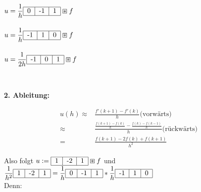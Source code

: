 \documentclass{article}
\theoremstyle{plain}
\theoremstyle{definition}
\numberwithin{equation}{section}
\newcommand{\mtitle}[1] {
    \begin{center}
        \large{\textbf{#1}}
    \end{center}
}
\begin{document}
    \begin{minipage}[c]{0.3\linewidth}
        \ \\
        $u=\displaystyle \frac{1}{h}\begin{tabular}{|c|c|c|}
            \hline
            0 & -1 & 1\\
            \hline
        \end{tabular} \boxast f$\\
        \ \\
        $u=\displaystyle \frac{1}{h}\begin{tabular}{|c|c|c|}
            \hline
            -1 & 1 & 0\\
            \hline
        \end{tabular} \boxast f$\\
        \ \\
        $u=\displaystyle \frac{1}{2h}\begin{tabular}{|c|c|c|}
            \hline
            -1 & 0 & 1\\
            \hline
            \end{tabular} \boxast f$\\
    \end{minipage}
    \ \\

    \mtitle{2. Ableitung:}

    \begin{align*}
        u(h) \approx & \frac{f'(k+1) - f'(k)}{h} \text{(vorwärts)}\\
        \approx & \frac{\frac{f(k+1) - f(k)}{h} - \frac{f(k) - f(k-1)}{h}}{h} \text{(rückwärts)} \\
        = & \frac{f(k+1) -2 f(k) + f(k+1)}{h^2}
    \end{align*}

    Also folgt $\displaystyle u:=\begin{tabular}{|c|c|c|}
        \hline
        1 & -2 & 1\\
        \hline
        \end{tabular} \boxast f$ und $\displaystyle \frac{1}{h^2}\begin{tabular}{|c|c|c|}
            \hline
            1 & -2 & 1\\
            \hline
            \end{tabular} = \frac{1}{h}\begin{tabular}{|c|c|c|}
                \hline
                0 & -1 & 1\\
                \hline
                \end{tabular} * \frac{1}{h}\begin{tabular}{|c|c|c|}
                    \hline
                    -1 & 1 & 0\\
                    \hline
                    \end{tabular}$\\
    Denn:
\end{document}

